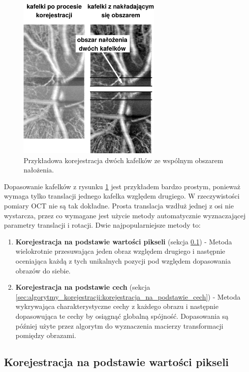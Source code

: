 \begin{figure}[htb]
  \centering
  \includegraphics[width=7cm]{gfx/align}
  \caption{Przykładowa korejestracja dwóch kafelków ze wspólnym obszarem nałożenia.}
  \label{fig:algorytmy_korejestracji:align}
\end{figure}

Dopasowanie kafelków z rysunku \ref{fig:algorytmy_korejestracji:align} jest przykładem bardzo prostym, ponieważ wymaga tylko translacji jednego kafelka względem drugiego. W rzeczywistości pomiary OCT nie są tak dokładne. Prosta translacja wzdłuż jednej z osi nie wystarcza, przez co wymagane jest użycie metody automatycznie wyznaczającej parametry translacji i rotacji. Dwie najpopularniejsze metody to:

\begin{enumerate}
\item \textbf{Korejestracja na podstawie wartości pikseli} (sekcja \ref{sec:algorytmy_korejestracji:korejestracja_na_podstawie_wartosci}) - Metoda wielokrotnie przesuwająca jeden obraz względem drugiego i następnie oceniająca każdą z tych unikalnych pozycji pod względem dopasowania obrazów do siebie.
\item \textbf{Korejestracja na podstawie cech} (sekcja \ref{sec:algorytmy_korejestracji:korejestracja_na_podstawie_cech}) - Metoda wykrywająca charakterystyczne cechy z każdego obrazu i następnie dopasowująca te cechy by osiągnąć globalną spójność. Dopasowania są później użyte przez algorytm do wyznaczenia macierzy transformacji pomiędzy obrazami.
\end{enumerate}

\subsection{Korejestracja na podstawie wartości pikseli}
\label{sec:algorytmy_korejestracji:korejestracja_na_podstawie_wartosci}

